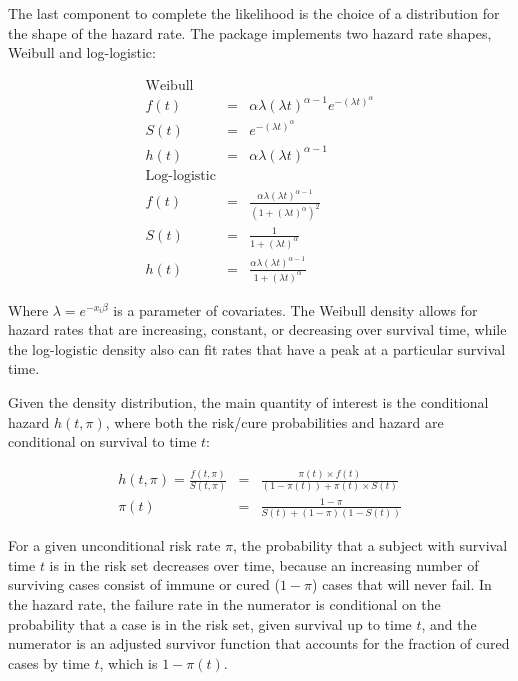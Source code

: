 The last component to complete the likelihood is the choice of a
distribution for the shape of the hazard rate. The 
package implements two hazard rate shapes, Weibull and log-logistic:

\begin{eqnarray*}
\textrm{Weibull} \\
 f(t) & = & \alpha \lambda (\lambda t)^{\alpha - 1} e^{-(\lambda t)^\alpha} \\
  S(t) & = & e^{ -(\lambda t )^\alpha } \\
 h(t) & = & \alpha \lambda (\lambda t)^{\alpha-1} \\
\textrm{Log-logistic} \\
 f(t) & = & \frac{ \alpha \lambda (\lambda t)^{\alpha-1} }{ (1 + (\lambda t)^\alpha)^2 } \\
 S(t) & = & \frac{1}{ 1+  (\lambda t)^\alpha }  \\
 h(t) & = & \frac{ \alpha \lambda (\lambda t)^{\alpha-1} }{ 1+  (\lambda t)^\alpha }
\end{eqnarray*}

Where \(\lambda = e^{-x_i\beta}\) is a parameter of covariates. The
Weibull density allows for hazard rates that are increasing, constant,
or decreasing over survival time, while the log-logistic density also
can fit rates that have a peak at a particular survival time.

Given the density distribution, the main quantity of interest is the
conditional hazard \(h(t, \pi)\), where both the risk/cure probabilities
and hazard are conditional on survival to time \(t\):

\begin{eqnarray}
h(t, \pi) = \frac{f(t, \pi)}{S(t, \pi)} & = & \frac{ \pi(t) \times f(t) }{ (1-\pi(t)) + \pi(t) \times S(t) } \\
 \pi(t) & = & \frac{ 1-\pi }{ S(t) + (1-\pi) (1 - S(t)) }
\end{eqnarray}

For a given unconditional risk rate \(\pi\), the probability that a
subject with survival time \(t\) is in the risk set decreases over time,
because an increasing number of surviving cases consist of immune or
cured (\(1-\pi\)) cases that will never fail. In the hazard rate, the
failure rate in the numerator is conditional on the probability that a
case is in the risk set, given survival up to time \(t\), and the
numerator is an adjusted survivor function that accounts for the
fraction of cured cases by time \(t\), which is \(1-\pi(t)\).


